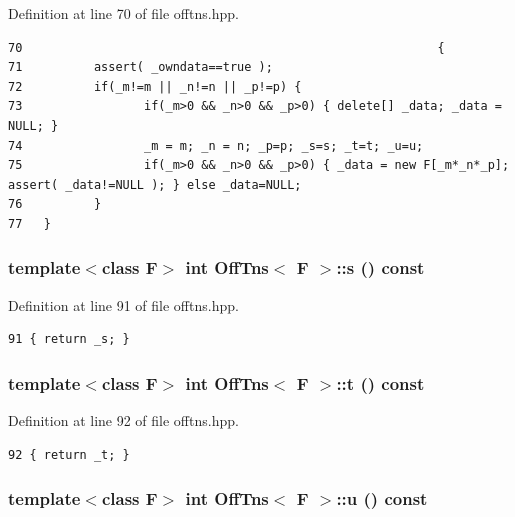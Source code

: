 Definition at line 70 of file offtns.hpp.

\footnotesize\begin{verbatim}70                                                          {
71          assert( _owndata==true );
72          if(_m!=m || _n!=n || _p!=p) {
73                 if(_m>0 && _n>0 && _p>0) { delete[] _data; _data = NULL; } 
74                 _m = m; _n = n; _p=p; _s=s; _t=t; _u=u;
75                 if(_m>0 && _n>0 && _p>0) { _data = new F[_m*_n*_p]; assert( _data!=NULL ); } else _data=NULL;
76          }
77   }
\end{verbatim}\normalsize 


\subsubsection{\setlength{\rightskip}{0pt plus 5cm}template$<$class F$>$ int {\bf Off\-Tns}$<$ F $>$::s () const\hspace{0.3cm}{\tt  [inline]}}\label{classOffTns_718f9fe30c4c5a49a2c162d5d70c314b_718f9fe30c4c5a49a2c162d5d70c314b}




Definition at line 91 of file offtns.hpp.

\footnotesize\begin{verbatim}91 { return _s; }
\end{verbatim}\normalsize 


\subsubsection{\setlength{\rightskip}{0pt plus 5cm}template$<$class F$>$ int {\bf Off\-Tns}$<$ F $>$::t () const\hspace{0.3cm}{\tt  [inline]}}\label{classOffTns_0fd352f0e5ea01103675de15233b95bd_0fd352f0e5ea01103675de15233b95bd}




Definition at line 92 of file offtns.hpp.

\footnotesize\begin{verbatim}92 { return _t; }
\end{verbatim}\normalsize 


\subsubsection{\setlength{\rightskip}{0pt plus 5cm}template$<$class F$>$ int {\bf Off\-Tns}$<$ F $>$::u () const\hspace{0.3cm}{\tt  [inline]}}\label{classOffTns_c98f4d9389a34876fd4957e8bee94b7f_c98f4d9389a34876fd4957e8bee94b7f}




